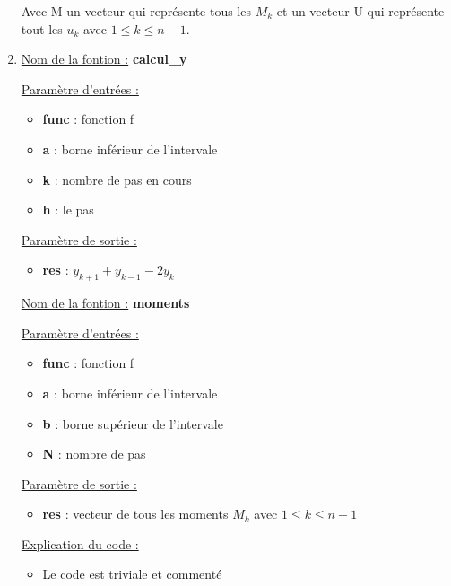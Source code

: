 \documentclass[12pt, letterpaper]{article}
\begin{document}
\begin{enumerate}
    Avec M un vecteur qui représente tous les $M_k$ \newline
    et un vecteur U qui représente tout les $u_k$ \newline
    avec $1 \le k \le n - 1$.
    

  \item

    \underline{Nom de la fontion :} \textbf{calcul\_y} \newline
    
    \underline{Paramètre d'entrées :}
    \begin{itemize}
    \item \textbf{func} : fonction f
    \item \textbf{a} : borne inférieur de l'intervale
    \item \textbf{k} : nombre de pas en cours
    \item \textbf{h} : le pas
    \end{itemize}

    \underline{Paramètre de sortie :}
    \begin{itemize}
    \item \textbf{res} : $y_{k + 1} + y_{k - 1} - 2 y_k$
    \end{itemize}

    \underline{Nom de la fontion :} \textbf{moments} \newline
    
    \underline{Paramètre d'entrées :}
    \begin{itemize}
    \item \textbf{func} : fonction f
    \item \textbf{a} : borne inférieur de l'intervale
    \item \textbf{b} : borne supérieur de l'intervale
    \item \textbf{N} : nombre de pas
    \end{itemize}

    \underline{Paramètre de sortie :}
    \begin{itemize}
    \item \textbf{res} : vecteur de tous les moments $M_k$ avec $1 \le
      k \le n - 1$
    \end{itemize}

    \underline{Explication du code :} \newline
    
    \begin{itemize}
    \item Le code est triviale et commenté
    \end{itemize}


\end{enumerate}
\end{document}
